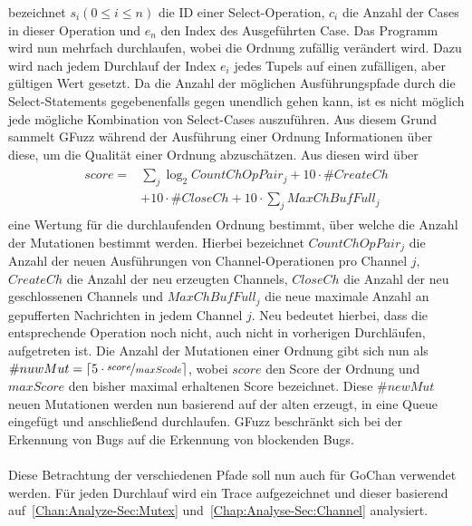 bezeichnet $s_i (0 \leq i \leq n)$ die ID einer Select-Operation, $c_i$ 
die Anzahl der Cases in dieser Operation und $e_n$ den Index des Ausgeführten 
Case. Das Programm wird nun mehrfach durchlaufen, wobei die Ordnung zufällig 
verändert wird. Dazu wird nach jedem Durchlauf der Index $e_i$ jedes Tupels 
auf einen zufälligen, aber gültigen Wert gesetzt. Da die Anzahl der möglichen 
Ausführungspfade durch die Select-Statements gegebenenfalls gegen unendlich gehen kann,
ist es nicht möglich jede mögliche Kombination von Select-Cases auszuführen.
Aus diesem Grund sammelt GFuzz während der Ausführung einer Ordnung Informationen 
über diese, um die Qualität einer Ordnung abzuschätzen. Aus diesen wird 
über 
\begin{align}
  \begin{split}
    score = &\sum_j \log_2{CountChOpPair_j} + 10 \cdot \# CreateCh \\
            &+ 10 \cdot \#CloseCh + 10 \cdot \sum_j MaxChBufFull_j
  \end{split}
\end{align}
eine Wertung für die durchlaufenden Ordnung bestimmt, über welche die 
Anzahl der Mutationen bestimmt werden. Hierbei bezeichnet $CountChOpPair_j$ 
die Anzahl der neuen Ausführungen von Channel-Operationen pro Channel $j$, $CreateCh$
die Anzahl der neu erzeugten Channels, $CloseCh$ die Anzahl der neu geschlossenen 
Channels und $MaxChBufFull_j$ die neue maximale Anzahl an 
gepufferten Nachrichten in jedem Channel $j$. Neu bedeutet hierbei, dass die
entsprechende Operation noch nicht, auch nicht in vorherigen Durchläufen, 
aufgetreten ist. Die Anzahl der Mutationen 
einer Ordnung gibt sich nun als $\# nuwMut = \lceil 5 \cdot \nicefrac{score}{maxScode} \rceil$, 
wobei $score$ den Score der Ordnung und $maxScore$ den bisher maximal 
erhaltenen Score bezeichnet. Diese $\# newMut$ neuen Mutationen werden nun 
basierend auf der alten erzeugt, in eine Queue eingefügt und anschließend 
durchlaufen. GFuzz beschränkt sich bei der Erkennung von Bugs auf die Erkennung
von blockenden Bugs.\\\\
Diese Betrachtung der verschiedenen Pfade soll nun auch für GoChan 
 verwendet werden. Für jeden Durchlauf wird 
ein Trace aufgezeichnet und dieser basierend 
auf~\ref{Chan:Analyze-Sec:Mutex} und~\ref{Chap:Analyse-Sec:Channel}
analysiert.
